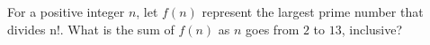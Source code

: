 For a positive integer $n$, let $f(n)$ represent the largest prime number that divides n!. What is the sum of $f(n)$ as $n$ goes from $2$ to $13$, inclusive?
